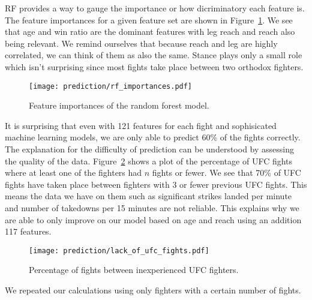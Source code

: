 RF provides a way to gauge the importance or how dicriminatory
each feature is. The feature importances for a given feature
set are shown in Figure~\ref{rf_importances}. We see that age
and win ratio are the dominant features with leg reach and reach
also being relevant. We remind ourselves that because reach and leg
are highly correlated, we can think of them as also the same. Stance
plays only a small role which isn't surprising since most fights
take place between two orthodox fighters.

\begin{figure}[h]
\begin{center}
\texttt{[image: prediction/rf\_importances.pdf]}
\caption{Feature importances of the random forest model.}
\label{rf_importances}
\end{center}
\end{figure}

It is surprising that even with 121 features for each fight
and sophisicated machine learning models, we are only able to
predict 60\% of the fights correctly. The explanation for
the difficulty of prediction can be understood by assessing the
quality of the data. Figure~\ref{lack_of_ufc_fights} shows
a plot of the percentage of UFC fights where at least one of the
fighters had $n$ fights or fewer. We see that 70\% of UFC fights
have taken place between fighters with 3 or fewer previous UFC
fights. This means the data we have on them such as significant
strikes landed per minute and number of takedowns per 15 minutes
are not reliable. This explains why we are able to only improve on
our model based on age and reach using an addition 117 features.

\begin{figure}[h]
\begin{center}
\texttt{[image: prediction/lack\_of\_ufc\_fights.pdf]}
\caption{Percentage of fights between inexperienced UFC fighters.}
\label{lack_of_ufc_fights}
\end{center}
\end{figure}

We repeated our calculations using only fighters with
a certain number of fights.


